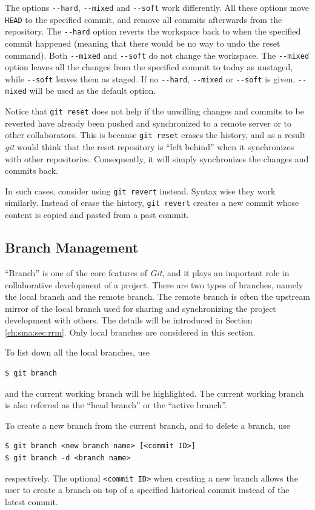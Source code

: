 The options \verb|--hard|, \verb|--mixed| and \verb|--soft| work differently. All these options move \verb|HEAD| to the specified commit, and remove all commits afterwards from the repository. The \verb|--hard| option reverts the workspace back to when the specified commit happened (meaning that there would be no way to undo the reset command). Both \verb|--mixed| and \verb|--soft| do not change the workspace. The \verb|--mixed| option leaves all the changes from the specified commit to today as unstaged, while \verb|--soft| leaves them as staged. If no \verb|--hard|, \verb|--mixed| or \verb|--soft| is given, \verb|--mixed| will be used as the default option.

Notice that \verb|git reset| does not help if the unwilling changes and commits to be reverted have already been pushed and synchronized to a remote server or to other collaborators. This is because \verb|git reset| erases the history, and as a result \textit{git} would think that the reset repository is ``left behind'' when it synchronizes with other repositories. Consequently, it will simply synchronizes the changes and commits back.

In such cases, consider using \verb|git revert| instead. Syntax wise they work similarly. Instead of erase the history, \verb|git revert| creates a new commit whose content is copied and pasted from a past commit.

\subsection{Branch Management}

``Branch'' is one of the core features of \textit{Git}, and it plays an important role in collaborative development of a project. There are two types of branches, namely the local branch and the remote branch. The remote branch is often the upstream mirror of the local branch used for sharing and synchronizing the project development with others. The details will be introduced in Section \ref{ch:sma:sec:rrm}. Only local branches are considered in this section.

To list down all the local branches, use
\begin{lstlisting}
$ git branch
\end{lstlisting}
and the current working branch will be highlighted. The current working branch is also referred as the ``head branch'' or the ``active branch''.

To create a new branch from the current branch, and to delete a branch, use
\begin{lstlisting}
$ git branch <new branch name> [<commit ID>]
$ git branch -d <branch name>
\end{lstlisting}
respectively. The optional \verb|<commit ID>| when creating a new branch allows the user to create a branch on top of a specified historical commit instead of the latest commit.

